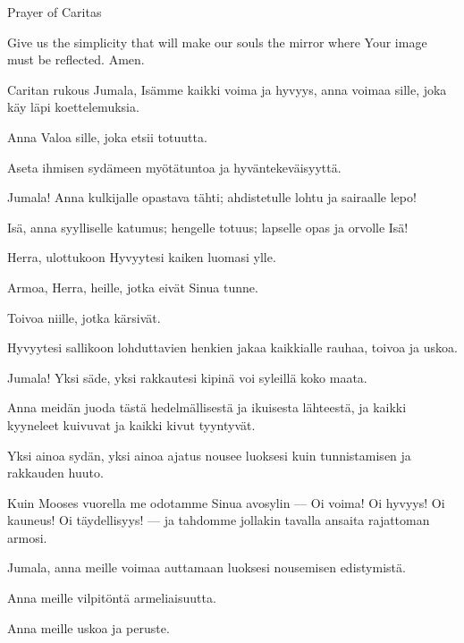 \begin{songs}{}
\begin{passage}[EN]{Prayer of Caritas}
          \par
          Give us the simplicity that will make our souls the
          mirror where Your image must be reflected. Amen.
        \end{passage}
        \begin{passage}[FI]{Caritan rukous}
          Jumala, Isämme kaikki voima ja hyvyys, anna voimaa sille, joka käy läpi koettelemuksia.
          \par
          Anna Valoa sille, joka etsii totuutta.
          \par
          Aseta ihmisen sydämeen myötätuntoa ja hyväntekeväisyyttä.
          \par
          Jumala! Anna kulkijalle opastava tähti;
          ahdistetulle lohtu ja sairaalle lepo!
          \par
          Isä, anna syylliselle katumus; hengelle totuus;
          lapselle opas ja orvolle Isä!
          \par
          Herra, ulottukoon Hyvyytesi kaiken luomasi ylle.
          \par
          Armoa, Herra, heille, jotka eivät Sinua tunne.
          \par
          Toivoa niille, jotka kärsivät.
          \par
          Hyvyytesi sallikoon lohduttavien henkien jakaa
          kaikkialle rauhaa, toivoa ja uskoa.
          \par
          Jumala! Yksi säde, yksi rakkautesi kipinä voi
          syleillä koko maata.
          \par
          Anna meidän juoda tästä hedelmällisestä ja
          ikuisesta lähteestä, ja kaikki kyyneleet kuivuvat
          ja kaikki kivut tyyntyvät.
          \par
          Yksi ainoa sydän, yksi ainoa ajatus nousee
          luoksesi kuin tunnistamisen ja rakkauden
          huuto.
          \par
          Kuin Mooses vuorella me odotamme Sinua
          avosylin --- Oi voima! Oi hyvyys! Oi kauneus!
          Oi täydellisyys! --- ja tahdomme jollakin tavalla
          ansaita rajattoman armosi.
          \par
          Jumala, anna meille voimaa auttamaan luoksesi nousemisen edistymistä.
          \par
          Anna meille vilpitöntä armeliaisuutta.
          \par
          Anna meille uskoa ja peruste.
          \par

\end{passage}
\end{songs}
